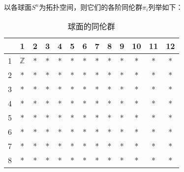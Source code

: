 

以各球面$S^n$为拓扑空间，则它们的各阶同伦群$\pi_i$列举如下：

\begin{table}[ht]
\centering
\caption{球面的同伦群}\label{SphHmt_tab1}
\begin{tabular}{|c|c|c|c|c|c|c|c|c|c|c|c|c|}
\hline
 & 1 & 2 & 3 & 4 & 5 & 6 & 7 & 8 & 9 & 10 & 11 & 12 \\
\hline
1 & $\mathbb{Z}$ & * & * & * & * & * & * & * & * & * & * & * \\
\hline
2 & * & * & * & * & * & * & * & * & * & * & * & * \\
\hline
3 & * & * & * & * & * & * & * & * & * & * & * & * \\
\hline
4 & * & * & * & * & * & * & * & * & * & * & * & * \\
\hline
5 & * & * & * & * & * & * & * & * & * & * & * & * \\
\hline
6 & * & * & * & * & * & * & * & * & * & * & * & * \\
\hline
7 & * & * & * & * & * & * & * & * & * & * & * & * \\
\hline
8 & * & * & * & * & * & * & * & * & * & * & * & * \\
\hline
\end{tabular}
\end{table}